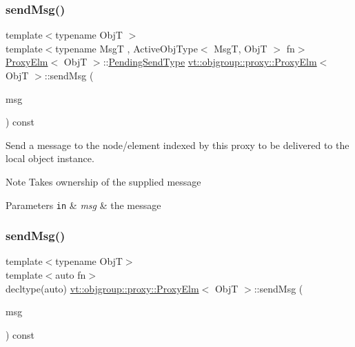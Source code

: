 \subsubsection{\texorpdfstring{send\+Msg()}{sendMsg()}\hspace{0.1cm}{\footnotesize\ttfamily [1/2]}}
{\footnotesize\ttfamily template$<$typename ObjT $>$ \\
template$<$typename MsgT , Active\+Obj\+Type$<$ Msg\+T, Obj\+T $>$ fn$>$ \\
\hyperlink{structvt_1_1objgroup_1_1proxy_1_1_proxy_elm}{Proxy\+Elm}$<$ ObjT $>$\+::\hyperlink{structvt_1_1objgroup_1_1proxy_1_1_proxy_elm_ab0f40d6a0191c974a4f4dd9dec0fc02f}{Pending\+Send\+Type} \hyperlink{structvt_1_1objgroup_1_1proxy_1_1_proxy_elm}{vt\+::objgroup\+::proxy\+::\+Proxy\+Elm}$<$ ObjT $>$\+::send\+Msg (\begin{DoxyParamCaption}\item[{\hyperlink{structvt_1_1messaging_1_1_msg_ptr_thief}{messaging\+::\+Msg\+Ptr\+Thief}$<$ MsgT $>$}]{msg }\end{DoxyParamCaption}) const}



Send a message to the node/element indexed by this proxy to be delivered to the local object instance. 

\begin{DoxyNote}{Note}
Takes ownership of the supplied message
\end{DoxyNote}

\begin{DoxyParams}[1]{Parameters}
\mbox{\tt in}  & {\em msg} & the message \\
\hline
\end{DoxyParams}
\mbox{\label{structvt_1_1objgroup_1_1proxy_1_1_proxy_elm_a26b48c8196ad767de25c48048eab65cd}} 
\subsubsection{\texorpdfstring{send\+Msg()}{sendMsg()}\hspace{0.1cm}{\footnotesize\ttfamily [2/2]}}
{\footnotesize\ttfamily template$<$typename ObjT$>$ \\
template$<$auto fn$>$ \\
decltype(auto) \hyperlink{structvt_1_1objgroup_1_1proxy_1_1_proxy_elm}{vt\+::objgroup\+::proxy\+::\+Proxy\+Elm}$<$ ObjT $>$\+::send\+Msg (\begin{DoxyParamCaption}\item[{\hyperlink{structvt_1_1messaging_1_1_msg_ptr_thief}{messaging\+::\+Msg\+Ptr\+Thief}$<$ typename \hyperlink{structvt_1_1_obj_func_traits}{Obj\+Func\+Traits}$<$ decltype(fn)$>$\+::MsgT $>$}]{msg }\end{DoxyParamCaption}) const\hspace{0.3cm}{\ttfamily [inline]}}



